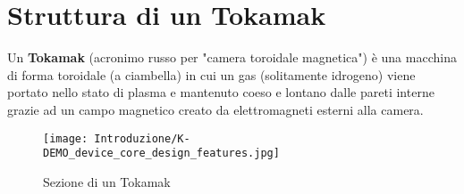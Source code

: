 \section*{Struttura di un Tokamak}
Un \textbf{Tokamak} (acronimo russo per "camera toroidale magnetica") è una macchina di forma toroidale (a ciambella) in cui un gas (solitamente idrogeno) viene portato nello stato di plasma e mantenuto coeso e lontano dalle pareti interne grazie ad un campo magnetico creato da elettromagneti esterni alla camera.
\begin{figure}[H]
	\centering
	\caption[Sezione di un Tokamak]{Sezione di un Tokamak}
	\texttt{[image: Introduzione/K-DEMO\_device\_core\_design\_features.jpg]}
\end{figure}

